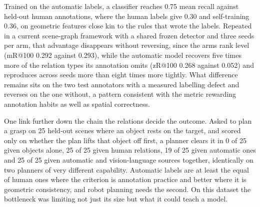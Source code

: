 Trained on the automatic labels, a classifier reaches 0.75 mean recall against held-out human annotations, where the human labels give 0.30 and self-training 0.36, on geometric features close kin to the rules that wrote the labels. Repeated in a current scene-graph framework with a shared frozen detector and three seeds per arm, that advantage disappears without reversing, since the arms rank level (mR@100 0.292 against 0.293), while the automatic model recovers five times more of the relation types its annotation omits (zR@100 0.268 against 0.052) and reproduces across seeds more than eight times more tightly. What difference remains sits on the two test annotators with a measured labelling defect and reverses on the one without, a pattern consistent with the metric rewarding annotation habits as well as spatial correctness.

One link further down the chain the relations decide the outcome. Asked to plan a grasp on 25 held-out scenes where an object rests on the target, and scored only on whether the plan lifts that object off first, a planner clears it in 0 of 25 given objects alone, 25 of 25 given human relations, 19 of 25 given automatic ones and 25 of 25 given automatic and vision-language sources together, identically on two planners of very different capability. Automatic labels are at least the equal of human ones where the criterion is annotation practice and better where it is geometric consistency, and robot planning needs the second. On this dataset the bottleneck was limiting not just its size but what it could teach a model.
